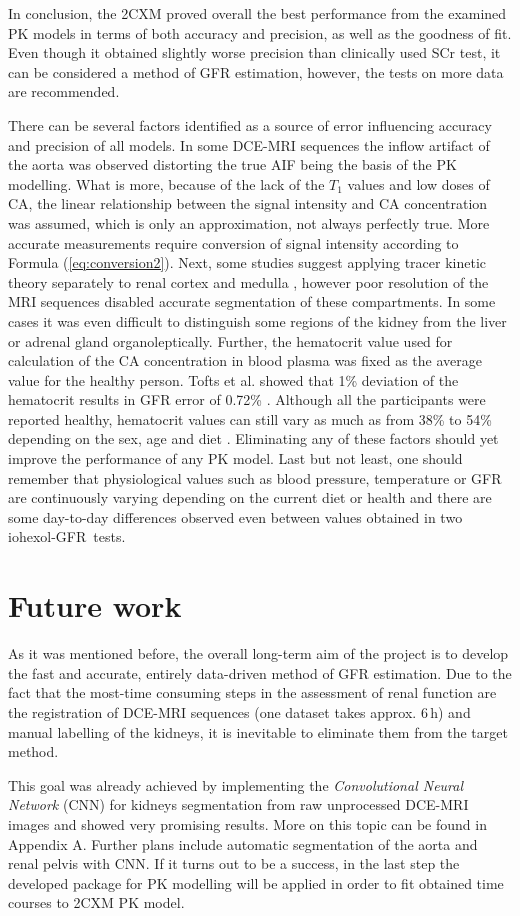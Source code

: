 In conclusion, the 2CXM proved overall the best performance from the examined PK models in terms of both accuracy and precision, as well as the goodness of fit. Even though it obtained slightly worse precision than clinically used SCr test, it can be considered a method of GFR estimation, however, the tests on more data are recommended.      


There can be several factors identified as a source of error influencing accuracy and precision of all models. In some DCE-MRI sequences the inflow artifact of the aorta was observed distorting the true AIF being the basis of the PK modelling.   
What is more, because of the lack of the $T_1$ values and low doses of CA, the linear relationship between the signal intensity and CA concentration was assumed, which is only an approximation, not always perfectly true. More accurate measurements require conversion of signal intensity according to Formula (\ref{eq:conversion2}).  
Next, some studies suggest applying tracer kinetic theory separately to renal cortex and medulla \cite{baumann2000quantitative, lee2007renal}, however poor resolution of the MRI sequences disabled accurate segmentation of these compartments. In some cases it was even difficult to distinguish some regions of the kidney from the liver or adrenal gland organoleptically.   
Further, the hematocrit value used for calculation of the CA concentration in blood plasma was fixed as the average value for the  healthy person. Tofts et al. \cite{tofts2012precise} showed that  1\% deviation of the hematocrit results in GFR error of 0.72\% . Although all the participants were reported healthy, hematocrit values can still vary as much as from 38\% to 54\% depending on the sex, age and diet \cite{hct}. Eliminating any of these factors should yet improve the performance of any PK model.   
Last but not least, one should remember that physiological values such as blood pressure, temperature or GFR are continuously varying depending on the current diet or health and there are some day-to-day differences observed even between values obtained in two iohexol-GFR~tests.

\section{Future work}
As it was mentioned before, the overall long-term aim of the project is to develop the fast and accurate, entirely data-driven method of GFR estimation. Due to the fact that the most-time consuming steps in the assessment of renal function are the registration of DCE-MRI sequences (one dataset takes approx. 6\,h) and manual labelling of the kidneys, it is inevitable to eliminate them from the target method.   

This goal was already achieved by implementing the \textit{Convolutional Neural Network} (CNN) for kidneys segmentation from raw unprocessed DCE-MRI images  and showed very promising results. 
More on this topic can be found in Appendix A. Further plans include automatic segmentation of the aorta and renal pelvis with CNN. If it turns out to be a success, in the last step the developed package for PK modelling will be applied in order to fit obtained time courses to 2CXM PK model.